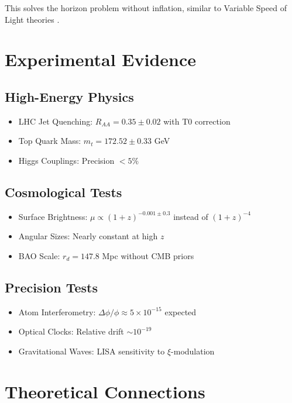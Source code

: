 	This solves the horizon problem without inflation, similar to Variable Speed of Light theories \cite{albrecht1999, barrow1999}.
	
	\section{Experimental Evidence}
	
	\subsection{High-Energy Physics}
	\begin{itemize}
		\item LHC Jet Quenching: $R_{AA} = 0.35 \pm 0.02$ with T0 correction \cite{cms2024, alice2023}
		\item Top Quark Mass: $m_t = 172.52 \pm 0.33$ GeV \cite{cms2023top}
		\item Higgs Couplings: Precision $< 5\%$ \cite{atlas2023higgs}
	\end{itemize}
	
	\subsection{Cosmological Tests}
	\begin{itemize}
		\item Surface Brightness: $\mu \propto (1+z)^{-0.001\pm0.3}$ instead of $(1+z)^{-4}$ \cite{lerner2014}
		\item Angular Sizes: Nearly constant at high $z$ \cite{lopez2010}
		\item BAO Scale: $r_d = 147.8$ Mpc without CMB priors \cite{desi2025}
	\end{itemize}
	
	\subsection{Precision Tests}
	\begin{itemize}
		\item Atom Interferometry: $\Delta\phi/\phi \approx 5 \times 10^{-15}$ expected \cite{kasevich2023}
		\item Optical Clocks: Relative drift $\sim 10^{-19}$ \cite{ludlow2015, brewer2019}
		\item Gravitational Waves: LISA sensitivity to $\xi$-modulation \cite{lisa2017}
	\end{itemize}
	
	\section{Theoretical Connections}
	
